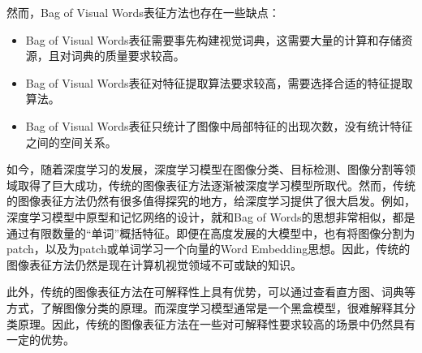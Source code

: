 然而，Bag of Visual Words表征方法也存在一些缺点：

\begin{itemize}
    \item Bag of Visual Words表征需要事先构建视觉词典，这需要大量的计算和存储资源，且对词典的质量要求较高。
    \item Bag of Visual Words表征对特征提取算法要求较高，需要选择合适的特征提取算法。
    \item Bag of Visual Words表征只统计了图像中局部特征的出现次数，没有统计特征之间的空间关系。
\end{itemize}

如今，随着深度学习的发展，深度学习模型在图像分类、目标检测、图像分割等领域取得了巨大成功，传统的图像表征方法逐渐被深度学习模型所取代。然而，传统的图像表征方法仍然有很多值得探究的地方，给深度学习提供了很大启发。例如，深度学习模型中原型和记忆网络的设计，就和Bag of Words的思想非常相似，都是通过有限数量的“单词”概括特征。即便在高度发展的大模型中，也有将图像分割为patch，以及为patch或单词学习一个向量的Word Embedding思想。因此，传统的图像表征方法仍然是现在计算机视觉领域不可或缺的知识。

此外，传统的图像表征方法在可解释性上具有优势，可以通过查看直方图、词典等方式，了解图像分类的原理。而深度学习模型通常是一个黑盒模型，很难解释其分类原理。因此，传统的图像表征方法在一些对可解释性要求较高的场景中仍然具有一定的优势。